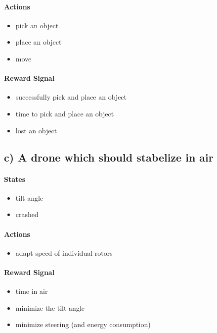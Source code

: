 \documentclass{article}
\begin{document}
\paragraph*{Actions}
\begin{itemize}
    \item pick an object
    \item place an object
    \item move
\end{itemize}


\paragraph*{Reward Signal}
\begin{itemize}
    \item successfully pick and place an object
    \item time to pick and place an object
    \item lost an object
\end{itemize}




\subsection*{c) A drone which should stabelize in air}

\paragraph*{States}
\begin{itemize}
    \item tilt angle
    \item crashed
\end{itemize}

\paragraph*{Actions}
\begin{itemize}
    \item adapt speed of individual rotors
\end{itemize}

\paragraph*{Reward Signal}
\begin{itemize}
    \item time in air
    \item minimize the tilt angle
    \item minimize steering (and energy consumption)
\end{itemize}
\end{document}
